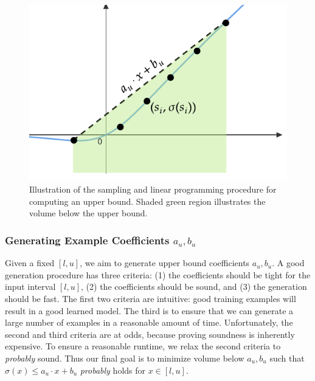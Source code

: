 \begin{figure}[t]
	\centering
	\includegraphics[width=0.99\linewidth]{offlinesyn/figs/sampling-lp.pdf}
	\caption{Illustration of the sampling and linear programming procedure for
	computing an upper bound. Shaded green region illustrates the volume below
	the upper bound.\label{offlinesyn:fig:samplelp}}
\end{figure}

\subsubsection{Generating Example Coefficients $ a_u, b_u $}
Given a fixed $ [l, u] $, we aim to generate upper bound coefficients $ a_u,
b_u $. A good generation procedure has three criteria: (1) the coefficients
should be tight for the input interval $ [l, u] $, (2) the coefficients should
be sound, and (3)
the generation should be fast. The first two criteria are intuitive: good training examples
will result in a good learned model. The third is to ensure that we can
generate a large number of examples in a reasonable amount of time.
Unfortunately, the second and third criteria are at odds, because proving
soundness is inherently expensive. To ensure a reasonable runtime, we relax the
second criteria to \textit{probably} sound. Thus our final goal is to minimize
volume below $ a_u, b_u $ such that $ \sigma(x) \leq a_u\cdot x + b_u $
\textit{probably} holds for $ x \in [l, u] $.

